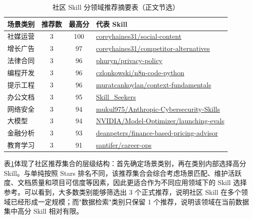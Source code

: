 \documentclass[UTF8,a4paper,12pt]{ctexart}
\begin{document}
\begin{table}[H]
\centering
\caption{社区 Skill 分领域推荐摘要表（正文节选）}
\label{tab:community-summary}
\small
\begin{tabularx}{\textwidth}{p{3.6cm} c c X}
\toprule
场景类别 & 推荐数 & 最高分 & 代表 Skill \\
\midrule
社媒运营 & 3 & 100 & \href{https://github.com/coreyhaines31/marketingskills/tree/main/skills/social-content}{coreyhaines31/social-content} \\
增长广告 & 3 & 97 & \href{https://github.com/coreyhaines31/marketingskills/tree/main/skills/competitor-alternatives}{coreyhaines31/competitor-alternatives} \\
法律合同 & 3 & 96 & \href{https://github.com/phuryn/pm-skills/tree/main/pm-toolkit/skills/privacy-policy}{phuryn/privacy-policy} \\
编程开发 & 3 & 96 & \href{https://github.com/czlonkowski/n8n-skills/tree/main/skills/n8n-code-python}{czlonkowski/n8n-code-python} \\
提示工程 & 3 & 96 & \href{https://github.com/muratcankoylan/Agent-Skills-for-Context-Engineering/tree/main/skills/context-fundamentals}{muratcankoylan/context-fundamentals} \\
办公文档 & 3 & 95 & \href{https://github.com/yusufkaraaslan/Skill_Seekers}{Skill\_Seekers} \\
网络安全 & 3 & 94 & \href{https://github.com/mukul975/Anthropic-Cybersecurity-Skills}{mukul975/Anthropic-Cybersecurity-Skills} \\
大模型 & 3 & 94 & \href{https://github.com/NVIDIA/skills/tree/main/skills/Model-Optimizer/launching-evals}{NVIDIA/Model-Optimizer/launching-evals} \\
金融分析 & 3 & 93 & \href{https://github.com/deanpeters/Product-Manager-Skills/tree/main/skills/finance-based-pricing-advisor}{deanpeters/finance-based-pricing-advisor} \\
教育学习 & 3 & 91 & \href{https://github.com/santifer/career-ops}{santifer/career-ops} \\
\bottomrule
\end{tabularx}
\end{table}

表\ref{tab:community-summary}体现了社区推荐集合的层级结构：首先确定场景类别，再在类别内部选择高分 Skill。与单纯按照 Stars 排名不同，该推荐集合会综合考虑场景匹配、维护活跃度、文档质量和项目可信度等因素，因此更适合作为不同应用领域下的 Skill 选择参考。可以看到，大多数类别能够筛选出 3 个正式推荐，说明社区 Skill 在多个领域已经形成一定规模；而"数据检索"类别只保留 1 个推荐，说明该领域在当前数据集中高分 Skill 相对有限。
\end{document}
